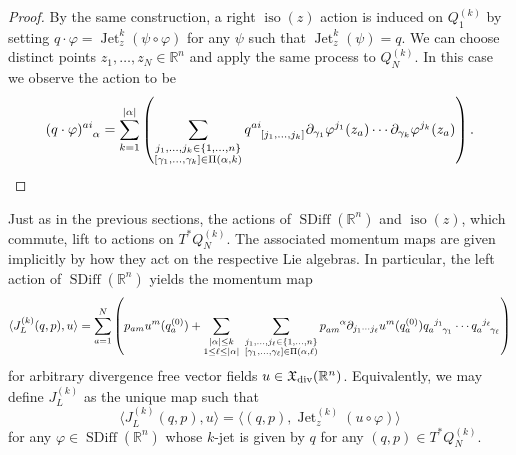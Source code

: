 \documentclass[12pt]{amsart}
\newcommand{\R}{\ensuremath{\mathbb{R}}}
\DeclareMathOperator{\SDiff}{SDiff}
\DeclareMathOperator{\Jet}{Jet}
\DeclareMathOperator{\iso}{iso}
\begin{document}
\begin{proof}
    By the same construction, a right $\iso(z)$ action is induced
    on $Q_1^{(k)}$ by setting $q \cdot \varphi = \Jet^k_z(\psi \circ \varphi)$ for any $\psi$ such that $\Jet^k_z(\psi) = q$.
    We can choose distinct points $z_1,\dots,z_N \in \R^n$
    and apply the same process to $Q_N^{(k)}$.  In this case we observe the action to be
    \begin{align*}
      (q \cdot \varphi)\indices{^{ai}_\alpha} = \sum_{k=1}^{|\alpha|}
      \left(
        \sum_{
        \substack{
          j_1,\dots,j_k \in \{1,\dots,n\} \\
          [\gamma_1,\dots,\gamma_k] \in \Pi(\alpha , k)
          }
          }
          q\indices{^{ai}_{[j_1,\dots,j_k]}}
          \partial_{\gamma_1} \varphi^{j_1}(z_a) \cdots
          \partial_{\gamma_k} \varphi^{j_k}(z_a)
        \right).
    \end{align*}
  \end{proof}
  
  Just as in the previous sections, the actions of $\SDiff(\R^n)$ and $\iso(z)$, which commute, lift to actions on $T^*Q_N^{(k)}$.
  The associated momentum maps are given implicitly by how they act on the respective Lie algebras.
  In particular, the left action of $\SDiff(\R^n)$ yields the momentum map
  \begin{equation*}
  	\langle J_L^{(k)}(q,p) , u \rangle =
	\sum_{a=1}^N \left( p_{am} u^m(q^{(0)}_a) +
    \sum_{\substack{ |\alpha| \leq k \\ 1 \leq \ell \leq |\alpha| }} \;
		\sum_{
			\substack{
				j_1,\dots,j_\ell \in \{1,\dots,n\} \\
				[\gamma_1,\dots,\gamma_\ell] \in \Pi(\alpha,\ell)
				}
			}
			p\indices{_a_m^\alpha} \partial_{j_1 \cdots j_\ell}u^m (q^{(0)}_a)
      q\indices{_a^{j_1}_{\gamma_1}} \cdots
      q\indices{_a^{j_\ell}_{\gamma_\ell}}
			\right)
  \end{equation*}
  for arbitrary divergence free vector fields $u \in \mathfrak{X}_{\rm div}(\R^n)$.
  Equivalently, we may define $J_L^{(k)}$ as the unique map such that
  \begin{equation}\label{eq:moma_left}
    \langle J_L^{(k)}(q,p) , u \rangle = \langle (q,p) , \Jet_z^{(k)}( u \circ \varphi) \rangle
  \end{equation}
  for any $\varphi \in \SDiff(\R^n)$ whose $k$-jet is given by $q$ for any $(q,p) \in T^*Q^{(k)}_N$.
\end{document}
